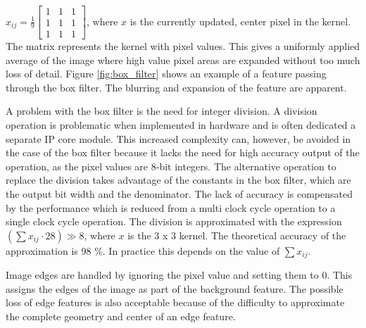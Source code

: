 \documentclass[12pt]{report}
\begin{document}
$x_{ij}=\frac{1}{9}
\begin{bmatrix}
1 & 1 & 1\\
1 & 1 & 1\\
1 & 1 & 1
\end{bmatrix}
$,
where $x$ is the currently updated, center pixel in the kernel. The matrix represents the kernel with pixel values. This gives a uniformly applied average of the image where high value pixel areas are expanded without too much loss of detail. Figure \ref*{fig:box_filter} shows an example of a feature passing through the box filter. The blurring and expansion of the feature are apparent. \citep{stpp}
\par
A problem with the box filter is the need for integer division. A division operation is problematic when implemented in hardware and is often dedicated a separate IP core module. This increased complexity can, however, be avoided in the case of the box filter because it lacks the need for high accuracy output of the operation, as the pixel values are 8-bit integers. The alternative operation to replace the division takes advantage of the constants in the box filter, which are the output bit width and the denominator. The lack of accuracy is compensated by the performance which is reduced from a multi clock cycle operation to a single clock cycle operation. The division is approximated with the expression
$
(\sum x_{ij} \cdot 28) \gg 8 
$, where $x$ is the 3 x 3 kernel. The theoretical accuracy of the approximation is 98 \%. In practice this depends on the value of $\sum x_{ij}$. \citep{stpp}
\par
Image edges are handled by ignoring the pixel value and setting them to 0. This assigns the edges of the image as part of the background feature. The possible loss of edge features is also acceptable because of the difficulty to approximate the complete geometry and center of an edge feature. \citep{stpp}
\end{document}
